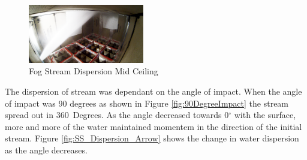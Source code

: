 \documentclass[12pt,oneside]{book}
\begin{document}
\begin{figure}[H]
	\centering
	\includegraphics[width=0.45\textwidth]{Figures/Water_Distribution/Nozzle_Directions/Interior_MidCeiling_Fog.png}
	\caption{Fog Stream Dispersion Mid Ceiling}
	\label{fig:Fog_Mid_Ceiling_Dispersion}
\end{figure}

The dispersion of stream was dependant on the angle of impact. When the angle of impact was 90 degrees as shown in Figure \ref{fig:90DegreeImpact} the stream spread out in 360~Degrees. As the angle decreased towards 0$^{\circ}$ with the surface, more and more of the water maintained momentem in the direction of the initial stream. Figure \ref{fig:SS_Dispersion_Arrow} shows the change in water dispersion as the angle decreases. 
\end{document}

